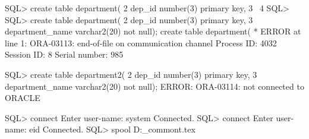 SQL> create table department(
  2  dep_id number(3) primary key,
  3  \
  4  
SQL> 
SQL> create table department(
  2  dep_id number(3) primary key,
  3   department_name varchar2(20) not null);
create table department(
*
ERROR at line 1:
ORA-03113: end-of-file on communication channel 
Process ID: 4032 
Session ID: 8 Serial number: 985 


SQL> create table department2(
  2  dep_id number(3) primary key,
  3   department_name varchar2(20) not null);
ERROR:
ORA-03114: not connected to ORACLE 


SQL> connect
Enter user-name: system
Connected.
SQL> connect
Enter user-name: eid
Connected.
SQL> spool D:\sql\test_commont.tex

